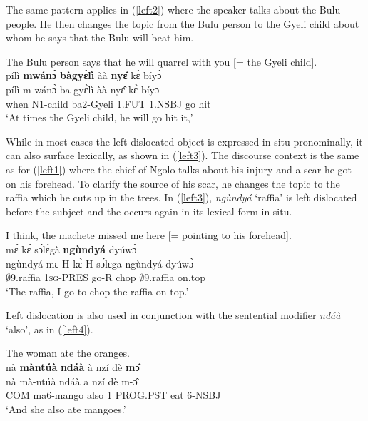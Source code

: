 The same pattern applies in (\ref{left2}) where the speaker talks about the Bulu people. He then changes the topic from the Bulu person to the Gyeli child about whom he says that the Bulu will beat him.

\begin{exe} 
\ex\label{left2}  The Bulu person says that he will quarrel with you [= the Gyeli child].\\
  \glll  pílì {\bfseries mwánɔ̀} {\bfseries bàgyɛ̀lì} àà {\bfseries nyɛ̂} kɛ̀ bíyɔ̀\\
       pílì m-wánɔ̀ ba-gyɛ̀lì àà nyɛ̂ kɛ̀ bíyɔ\\
          when N1-child ba2-Gyeli 1.FUT 1.NSBJ go hit\\
    \trans `At times the Gyeli child, he will go hit it,'
\end{exe}

\noindent While in most cases the left dislocated object is expressed in-situ pronominally, it can also surface lexically, as shown in (\ref{left3}). The discourse context is the same as for (\ref{left1}) where the chief of Ngolo talks about his injury and a scar he got on his forehead. To clarify the source of his scar, he changes the topic to the raffia which he cuts up in the trees. In (\ref{left3}), {\itshape ngùndyá} `raffia' is left dislocated before the subject and the occurs again in its lexical form in-situ.

\begin{exe} 
\ex\label{left3} I think, the machete missed me here [= pointing to his forehead].\\
   mɛ́ kɛ́ sɔ́lɛ̀gà {\bfseries ngùndyá} dyúwɔ̀\\
          ngùndyá mɛ-H kɛ̀-H sɔ́lɛga ngùndyá dyúwɔ̀\\
              $\emptyset$9.raffia 1\textsc{sg}-PRES go-R chop $\emptyset$9.raffia on.top\\
    \trans `The raffia, I go to chop the raffia on top.'
\end{exe}

Left dislocation is also used in conjunction with the sentential modifier {\itshape ndáà} `also', as in (\ref{left4}). 

\begin{exe} 
\ex\label{left4} The woman ate the oranges.\\
   \glll  nà {\bfseries màntúà} {\bfseries ndáà} à nzí dè {\bfseries mɔ̂}\\
       nà mà-ntúà ndáà a nzí dè m-ɔ̂\\
       COM ma6-mango also 1 PROG.PST eat 6-NSBJ\\
    \trans `And she also ate mangoes.'
\end{exe}

